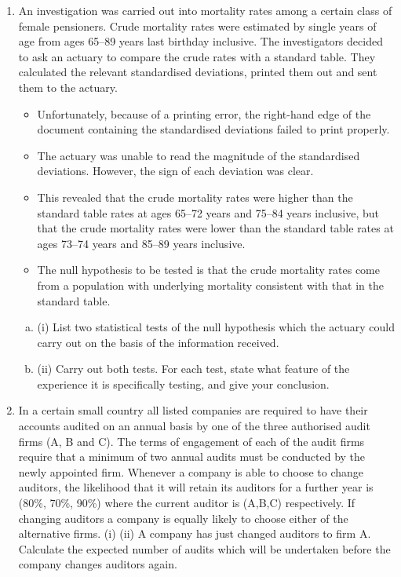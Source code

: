 \documentclass[a4paper,12pt]{article}
\begin{document}
\begin{enumerate}
\item An investigation was carried out into mortality rates among a certain class of female
pensioners. Crude mortality rates were estimated by single years of age from ages
65–89 years last birthday inclusive. The investigators decided to ask an actuary to
compare the crude rates with a standard table. They calculated the relevant
standardised deviations, printed them out and sent them to the actuary.
\begin{itemize}
    \item Unfortunately, because of a printing error, the right-hand edge of the document
containing the standardised deviations failed to print properly.
\item The actuary was
unable to read the magnitude of the standardised deviations. However, the sign of
each deviation was clear.
\item This revealed that the crude mortality rates were higher
than the standard table rates at ages 65–72 years and 75–84 years inclusive, but that
the crude mortality rates were lower than the standard table rates at ages 73–74 years
and 85–89 years inclusive.
\item The null hypothesis to be tested is that the crude mortality rates come from a
population with underlying mortality consistent with that in the standard table.
\end{itemize}

\begin{enumerate}[(a)]
    \item (i) List two statistical tests of the null hypothesis which the actuary could carry
out on the basis of the information received.

    \item (ii) Carry out both tests. For each test, state what feature of the experience it is
specifically testing, and give your conclusion.
\end{enumerate}

\newpage
\item 
In a certain small country all listed companies are required to have their accounts
audited on an annual basis by one of the three authorised audit firms (A, B and C).
The terms of engagement of each of the audit firms require that a minimum of two
annual audits must be conducted by the newly appointed firm. Whenever a company
is able to choose to change auditors, the likelihood that it will retain its auditors for a
further year is (80\%, 70\%, 90\%) where the current auditor is (A,B,C) respectively. If
changing auditors a company is equally likely to choose either of the alternative firms.
(i)
(ii)
A company has just changed auditors to firm A. Calculate the expected
number of audits which will be undertaken before the company changes
auditors again.


\end{enumerate}
\end{document}
